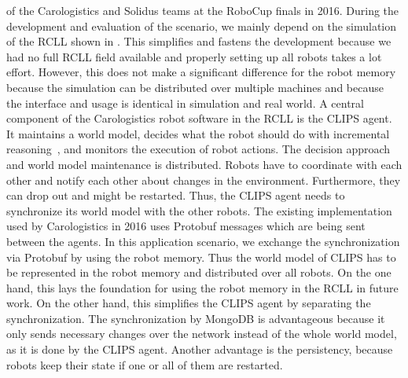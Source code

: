 of the Carologistics and Solidus teams at the RoboCup finals in
2016. During the development and evaluation of the scenario, we mainly
depend on the simulation of the RCLL shown in
. This simplifies and fastens the development
because we had no full RCLL field available and properly setting up
all robots takes a lot effort. However, this does not make a
significant difference for the robot memory because the simulation can
be distributed over multiple machines and because the interface and
usage is identical in simulation and real world.
 A central component of
the Carologistics robot software in the RCLL is the CLIPS agent. It
maintains a world model, decides what the robot should do with
incremental reasoning~\cite{CLIPS-Agent}, and monitors the execution
of robot actions. The decision approach and world model maintenance is
distributed. Robots have to coordinate with each other and notify each
other about changes in the environment. Furthermore, they can drop out
and might be restarted. Thus, the CLIPS agent needs to synchronize its
world model with the other robots. The existing implementation used by
Carologistics in 2016 uses Protobuf messages which are being sent
between the agents. In this application scenario, we exchange the
synchronization via Protobuf by using the robot memory. Thus the world
model of CLIPS has to be represented in the robot memory and
distributed over all robots. On the one hand, this lays the foundation
for using the robot memory in the RCLL in future work. On the other
hand, this simplifies the CLIPS agent by separating the
synchronization. The synchronization by MongoDB is advantageous
because it only sends necessary changes over the network instead of
the whole world model, as it is done by the CLIPS agent. Another
advantage is the persistency, because robots keep their state if one
or all of them are restarted.

